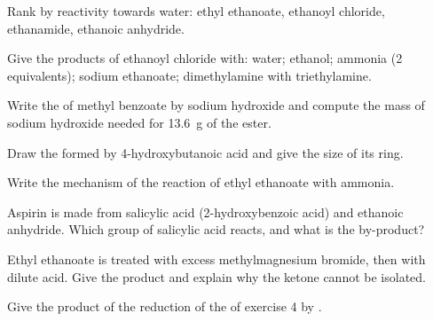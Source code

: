 \begin{exercise}[$\star$]\label{exo:b2:acyl-substitution:1}
Rank by reactivity towards water: ethyl ethanoate, ethanoyl chloride, ethanamide, ethanoic
anhydride.
\end{exercise}

\begin{exercise}[$\star$]\label{exo:b2:acyl-substitution:2}
Give the products of ethanoyl chloride with: water; ethanol; ammonia (2 equivalents);
sodium ethanoate; dimethylamine with triethylamine.
\end{exercise}

\begin{exercise}[$\star$]\label{exo:b2:acyl-substitution:3}
Write the  of methyl benzoate by sodium hydroxide and compute the mass of sodium
hydroxide needed for \qty{13.6}{g} of the ester.
\end{exercise}

\begin{exercise}[$\star$]\label{exo:b2:acyl-substitution:4}
Draw the  formed by 4-hydroxybutanoic acid and give the size of its ring.
\end{exercise}

\begin{exercise}[$\star\star$]\label{exo:b2:acyl-substitution:5}
Write the mechanism of the reaction of ethyl ethanoate with ammonia.
\end{exercise}

\begin{exercise}[$\star\star$]\label{exo:b2:acyl-substitution:6}
Aspirin is made from salicylic acid (2-hydroxybenzoic acid) and ethanoic anhydride. Which group
of salicylic acid reacts, and what is the by-product?
\end{exercise}

\begin{exercise}[$\star\star$]\label{exo:b2:acyl-substitution:7}
Ethyl ethanoate is treated with excess methylmagnesium bromide, then with dilute acid. Give the
product and explain why the ketone cannot be isolated.
\end{exercise}

\begin{exercise}[$\star\star$]\label{exo:b2:acyl-substitution:8}
Give the product of the reduction of the  of exercise 4 by .
\end{exercise}

